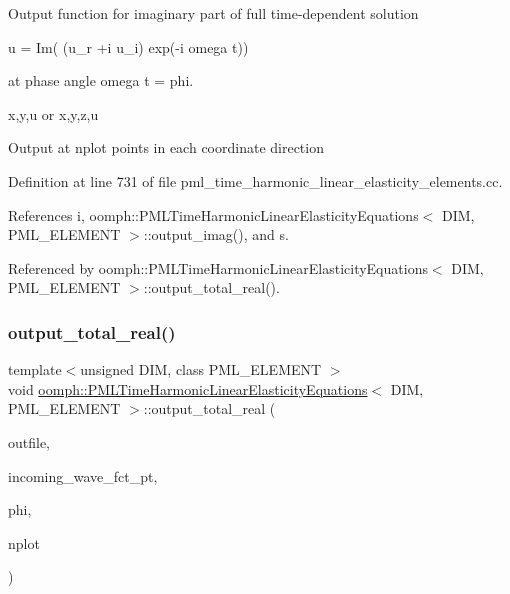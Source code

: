 Output function for imaginary part of full time-\/dependent solution

u = Im( (u\+\_\+r +i u\+\_\+i) exp(-\/i omega t))

at phase angle omega t = phi.

x,y,u or x,y,z,u

Output at nplot points in each coordinate direction 

Definition at line 731 of file pml\+\_\+time\+\_\+harmonic\+\_\+linear\+\_\+elasticity\+\_\+elements.\+cc.



References i, oomph\+::\+P\+M\+L\+Time\+Harmonic\+Linear\+Elasticity\+Equations$<$ D\+I\+M, P\+M\+L\+\_\+\+E\+L\+E\+M\+E\+N\+T $>$\+::output\+\_\+imag(), and s.



Referenced by oomph\+::\+P\+M\+L\+Time\+Harmonic\+Linear\+Elasticity\+Equations$<$ D\+I\+M, P\+M\+L\+\_\+\+E\+L\+E\+M\+E\+N\+T $>$\+::output\+\_\+total\+\_\+real().

\mbox{\label{classoomph_1_1PMLTimeHarmonicLinearElasticityEquations_adc716e5d41eceaefd8eb76479dd72650}} 
\subsubsection{\texorpdfstring{output\+\_\+total\+\_\+real()}{output\_total\_real()}}
{\footnotesize\ttfamily template$<$unsigned D\+IM, class P\+M\+L\+\_\+\+E\+L\+E\+M\+E\+NT $>$ \\
void \hyperlink{classoomph_1_1PMLTimeHarmonicLinearElasticityEquations}{oomph\+::\+P\+M\+L\+Time\+Harmonic\+Linear\+Elasticity\+Equations}$<$ D\+IM, P\+M\+L\+\_\+\+E\+L\+E\+M\+E\+NT $>$\+::output\+\_\+total\+\_\+real (\begin{DoxyParamCaption}\item[{std\+::ostream \&}]{outfile,  }\item[{\hyperlink{classoomph_1_1FiniteElement_a690fd33af26cc3e84f39bba6d5a85202}{Finite\+Element\+::\+Steady\+Exact\+Solution\+Fct\+Pt}}]{incoming\+\_\+wave\+\_\+fct\+\_\+pt,  }\item[{const double \&}]{phi,  }\item[{const unsigned \&}]{nplot }\end{DoxyParamCaption})}

